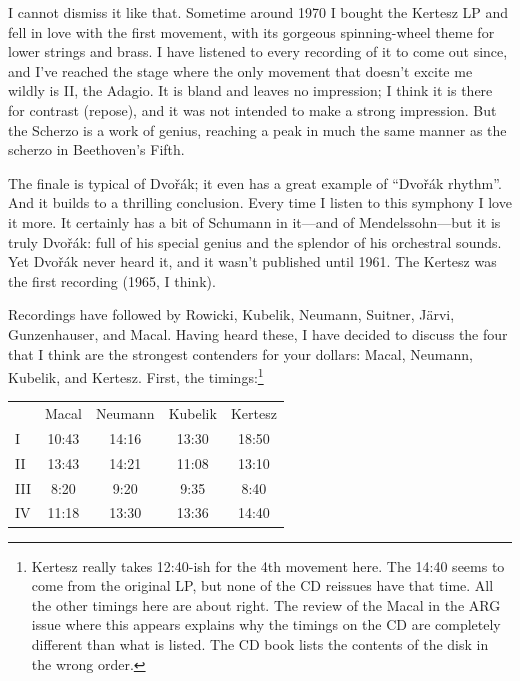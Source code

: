 \documentclass[12pt]{article}%
\begin{document}
I cannot dismiss it like that. Sometime around 1970 I bought the Kertesz LP and fell in love with the first movement, with its gorgeous spinning-wheel theme for lower strings and brass. I have listened to every recording of it to come out since, and I've reached the stage where the only movement that doesn't excite me wildly is II, the Adagio. It is bland and leaves no impression; I think it is there for contrast (repose), and it was not intended to make a strong impression. But the Scherzo is a work of genius, reaching a peak in much the same manner as the scherzo in Beethoven's Fifth.

The finale is typical of Dvořák; it even has a great example of ``Dvořák rhythm''.
And it builds to a thrilling conclusion. Every time I listen to this symphony I love it more. It certainly has a bit of Schumann in it---and of Mendelssohn---but it is truly Dvořák: full of his special genius and the splendor of his orchestral sounds. Yet Dvořák never heard it, and it wasn't published until 1961. The Kertesz was the first recording (1965, I think).

Recordings have followed by Rowicki, Kubelik, Neumann, Suitner, Järvi, Gunzenhauser, and Macal. Having heard these, I have decided to discuss the four that I think are the strongest contenders for your dollars: Macal, Neumann, Kubelik, and Kertesz. First, the timings:\footnote{Kertesz really takes 12:40-ish for the 4th movement here. The 14:40 seems to come from the original LP, but none of the CD reissues have that time. All the other timings here are about right. The review of the Macal in the ARG issue where this appears explains why the timings on the CD are completely different than what is listed. The CD book lists the contents of the disk in the wrong order.}

\begin{center}
\begin{tabular}{l c c c c}
&Macal & Neumann & Kubelik & Kertesz\\
I & 10:43 & 14:16 & 13:30 &18:50\\
II & 13:43 & 14:21 & 11:08 & 13:10\\
III & 8:20 &  9:20 & 9:35 & 8:40 \\
IV & 11:18 & 13:30 & 13:36 & 14:40\\
\end{tabular}
\end{center}
\end{document}
